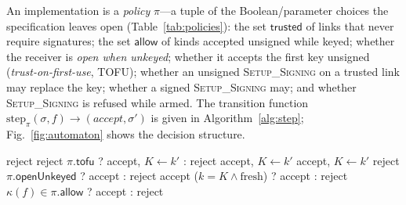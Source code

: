 \documentclass[conference]{IEEEtran}
\newcommand{\msig}{\textsc{Setup\_Signing}}
\begin{document}
An implementation is a \emph{policy} $\pi$---a tuple of the Boolean/parameter
choices the specification leaves open (Table~\ref{tab:policies}): the set
$\mathsf{trusted}$ of links that never require signatures; the set
$\mathsf{allow}$ of kinds accepted unsigned while keyed; whether the receiver is
\emph{open when unkeyed}; whether it accepts the first key unsigned
(\emph{trust-on-first-use}, TOFU); whether an unsigned \msig{} on a trusted link
may replace the key; whether a signed \msig{} may; and whether \msig{} is
refused while armed. The transition function
$\mathrm{step}_\pi(\sigma,f)\to(\mathit{accept},\sigma')$ is given in
Algorithm~\ref{alg:step}; Fig.~\ref{fig:automaton} shows the decision structure.

\begin{algorithm}[t]
\caption{$\mathrm{step}_\pi(\sigma,f)$: acceptance decision}
\label{alg:step}
\small
\begin{algorithmic}[1]
 
     \State \Return reject
  \EndIf
   \State \Return reject \EndIf
     \State \Return $\pi.\mathsf{tofu}$ ? accept, $K{\gets}k'$ : reject
  \EndIf
     \State \Return accept, $K{\gets}k'$ 
  \EndIf
     \State \Return accept, $K{\gets}k'$ 
  \EndIf
  \State \Return reject
\EndIf
{} \State \Return $\pi.\mathsf{openUnkeyed}$ ? accept : reject \EndIf
{} \State \Return accept \EndIf
{}
  \State \Return ($k=K\wedge\mathrm{fresh}$) ? accept : reject
\EndIf
\State \Return $\kappa(f)\in\pi.\mathsf{allow}$ ? accept : reject
\end{algorithmic}
\end{algorithm}
\end{document}
